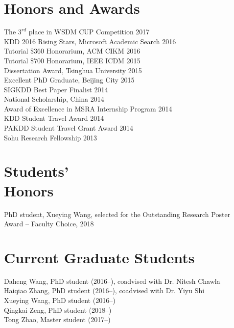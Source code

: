 \documentclass[margin, 9pt]{res}
\begin{document}
\begin{resume}

\section{Honors and Awards}

{The $3^{rd}$ place in WSDM CUP Competition} \hfill{2017} \\
{KDD 2016 Rising Stars, Microsoft Academic Search} \hfill{2016} \\
{Tutorial \$360 Honorarium, ACM CIKM} \hfill{2016} \\
{Tutorial \$700 Honorarium, IEEE ICDM} \hfill{2015} \\
{Dissertation Award, Tsinghua University} \hfill{2015} \\
{Excellent PhD Graduate, Beijing City} \hfill{2015} \\
{SIGKDD Best Paper Finalist} \hfill{2014} \\
{National Scholarship, China} \hfill{2014} \\
{Award of Excellence in MSRA Internship Program} \hfill{2014} \\
{KDD Student Travel Award} \hfill{2014} \\
{PAKDD Student Travel Grant Award} \hfill{2014} \\
{Sohu Research Fellowship} \hfill{2013}

\section{Students' \\ Honors}

{PhD student, Xueying Wang, selected for the Outstanding Research Poster Award -- Faculty Choice, 2018}


\section{Current Graduate Students}

{Daheng Wang, PhD student (2016--), coadvised with Dr. Nitesh Chawla} \\
{Haiqiao Zhang, PhD student (2016--), coadvised with Dr. Yiyu Shi} \\
{Xueying Wang, PhD student (2016--)} \\
{Qingkai Zeng, PhD student (2018--)} \\
{Tong Zhao, Master student (2017--)}


\end{resume}
\end{document}
